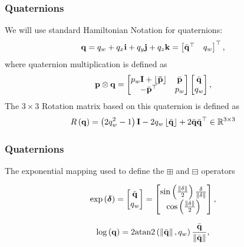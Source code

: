 \documentclass{beamer}
\begin{document}
\begin{frame}
\frametitle{Quaternions}
We will use standard Hamiltonian Notation for quaternions:
\begin{equation}
{\bf q}=q_{w}+q_{x}{\bf i}+q_{y}{\bf j}+q_{z}{\bf k}=\begin{bmatrix}\bar{{\bf q}}^{\top} & q_{w}\end{bmatrix}^{\top},
\end{equation}
where quaternion multiplication is defined as
\begin{equation}
{\bf p}\otimes{\bf q}=\begin{bmatrix}p_{w}{\bf I+\left\lfloor \bar{{\bf p}}\right\rfloor } & \bar{{\bf p}}\\
-\bar{{\bf p}}^{\top} & p_{w}
\end{bmatrix}\begin{bmatrix}\bar{{\bf q}}\\
q_{w}
\end{bmatrix},
\end{equation}
The $3\times3$ Rotation matrix based on this quaternion is defined
as
\begin{equation}
R\left({\bf q}\right)=\left(2q_{w}^{2}-1\right){\bf I}-2q_{w}\left\lfloor \bar{{\bf q}}\right\rfloor +2\bar{{\bf q}}\bar{{\bf q}}^{\top}\in\mathbb{R}^{3\times3}
\end{equation}
\end{frame}


\begin{frame}
\frametitle{Quaternions}
The exponential mapping used to define the $\boxplus$ and $\boxminus$
operators 

\begin{equation}
\exp\left(\boldsymbol{\delta}\right)=\begin{bmatrix}\bar{{\bf q}}\\
q_{w}
\end{bmatrix}=\begin{bmatrix}\sin\left(\frac{\lVert\delta\rVert}{2}\right)\frac{\delta}{\lVert\delta\rVert}\\
\cos\left(\frac{\lVert\delta\rVert}{2}\right)
\end{bmatrix},
\end{equation}


\begin{equation}
\log\left({\bf q}\right)=2\mathrm{atan2}\left(\left\Vert \bar{{\bf q}}\right\Vert ,q_{w}\right)\frac{\bar{{\bf q}}}{\left\Vert \bar{{\bf q}}\right\Vert },
\end{equation}
\end{frame}
\end{document}
